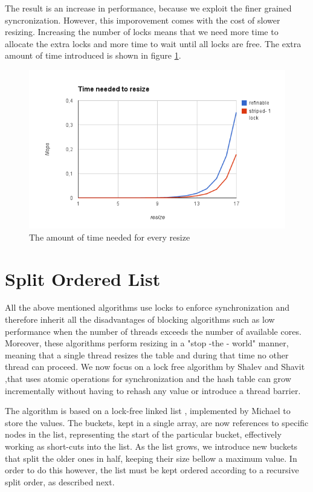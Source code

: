 The result is an increase in performance, because we exploit the finer grained syncronization. However, this imporovement comes with the cost of slower resizing. Increasing the number of locks means that we need more time to allocate the extra locks and more time to wait until all locks are free. The extra amount of time introduced is shown in figure \ref{hashes_refinable_resize}.
 
\begin{figure}
 \centering
  \includegraphics[scale=0.7]{hashes_refinable_resize.png}
\caption{The amount of time needed for every resize}
\label{hashes_refinable_resize}
\end{figure}

\section { Split Ordered List}

All the above mentioned algorithms use locks to enforce synchronization and therefore inherit all the disadvantages of blocking algorithms such as low performance when the number of threads exceeds the number of available cores. Moreover, these algorithms perform resizing in a "stop -the - world" manner, meaning that a single thread resizes the table and during that time no other thread can proceed. We now focus on a lock free algorithm  by  Shalev and Shavit  \cite{split_ordered} ,that uses atomic operations for synchronization and the hash table can grow incrementally without having to rehash any value or introduce a thread barrier.

The algorithm is based on a lock-free linked list , implemented by Michael \cite{lock_free_list} to store the values. The buckets, kept in a single array, are now references to specific nodes in the list, representing the start of the particular bucket, effectively working as short-cuts into the list. As the list grows, we introduce new buckets that split the older ones in half, keeping their size bellow a maximum value. In order to do this however, the list must be kept ordered according to a recursive split order, as described next.


